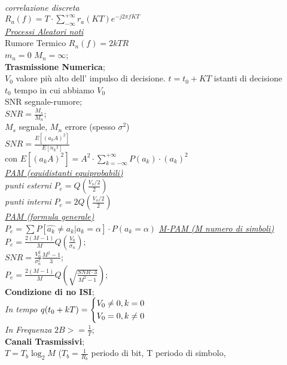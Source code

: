 \documentclass[a4paper]{article}
\begin{document}
\begin{multicols*}{3}
\textit{correlazione discreta} \\
$R_a(f)=T\cdot\sum_{-\infty}^{+\infty}r_a(KT)e^{-j2\pi fKT}$ \\
\underline{\textit{Processi Aleatori noti}} \\
Rumore Termico $R_n(f)=2kTR$ \\
$m_n=0$ $M_n=\infty$; \\
\textbf{Trasmissione Numerica}; \\
$V_0$ valore più alto dell' impulso di decisione. 
$t=t_0 + KT$ istanti di decisione\\
$t_0$ tempo in cui abbiamo $V_0$ \\
SNR segnale-rumore; \\
$SNR=\frac{M_s}{M_n}$; \\ $M_s$ segnale, $M_n$ errore (spesso $\sigma^2$) \\ 
$SNR=\frac{E[{(a_k A)}^{2}]}{E[{n_k}^{2}]}$ \\
con $E[{(a_k A)}^{2}] = {A}^{2}\cdot \sum_{k=-\infty}^{+\infty}{P(a_k)\cdot {(a_k)}^{2}}$\\
\underline{\textit{PAM (equidistanti equiprobabili)}} \\
\textit{punti esterni}
$P_e = Q(\frac{V_o / 2}{2}) $ \\
\textit{punti interni }
$P_e = 2Q(\frac{V_o / 2}{2}) $ \\
\underline{\textit{PAM (formula generale)}} \\
$P_e=\sum{P[\widehat{a_k} \ne a_k | a_k=\alpha]\cdot P(a_k=\alpha)}$
\underline{\textit{M-PAM (M numero di simboli) }} \\
$P_e = \frac{2(M-1)}{M}Q(\frac{V_0}{\sigma_n})$;\\
$SNR = \frac{V_0^2}{\sigma_n^2}\frac{M^2-1}{3}$; \\
$P_e = \frac{2(M-1)}{M}Q(\sqrt{\frac{SNR \cdot 3}{M^2-1}})$; \\
\textbf{Condizione di no ISI}; \\
\textit{In tempo}
 $ q(t_{0}+kT)=
\begin{dcases}
    V_0\ne0 , k=0  \\
    V_0=0, k\ne0  \\
\end{dcases}
$ \\
\textit{In Frequenza}
$2B >= \frac{1}{T}$; \\
\textbf{Canali Trasmissivi}; \\
$T=T_b \log_{2}{M}$ ($T_b = \frac{1}{R_b}$ periodo di bit, T periodo di simbolo,

\end{multicols*}
\end{document}
